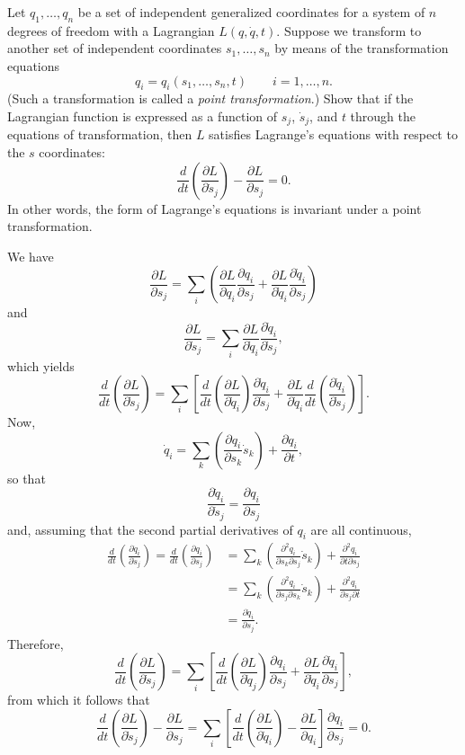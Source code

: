 \begin{questions}
\question Let $q_1, \ldots, q_n$ be a set of independent generalized coordinates for a system of $n$ degrees of freedom with a Lagrangian $L ( q, \dot{q}, t )$. Suppose we transform to another set of independent coordinates $s_1, \ldots, s_n$ by means of the transformation equations
\[
q_i = q_i ( s_1, \ldots, s_n, t ) \qquad i = 1, \ldots, n.
\]
(Such a transformation is called a \emph{point transformation}.) Show that if the Lagrangian function is expressed as a function of $s_j$, $\dot{s}_j$, and $t$ through the equations of transformation, then $L$ satisfies Lagrange's equations with respect to the $s$ coordinates:
\[
\frac{d}{dt} \left( \frac{\partial L}{\partial \dot{s}_j} \right) - \frac{\partial L}{\partial s_j} = 0.
\]
In other words, the form of Lagrange's equations is invariant under a point transformation.
\begin{solution}
We have
\[
\frac{\partial L}{\partial s_j} = \sum_i \left( \frac{\partial L}{\partial q_i} \frac{\partial q_i}{\partial s_j} + \frac{\partial L}{\partial \dot{q}_i} \frac{\partial \dot{q}_i}{\partial s_j} \right)
\]
and
\[
\frac{\partial L}{\partial \dot{s}_j} = \sum_i \frac{\partial L}{\partial \dot{q}_i} \frac{\partial \dot{q}_i}{\partial \dot{s}_j},
\]
which yields
\[
\frac{d}{dt} \left( \frac {\partial L}{\partial \dot{s}_j} \right) = \sum_i \left[ \frac{d}{dt} \left( \frac{\partial L}{\partial \dot{q}_i} \right) \frac{\partial \dot{q}_i}{\partial \dot{s}_j} + \frac{\partial L}{\partial \dot{q}_i} \frac{d}{dt} \left( \frac{\partial \dot{q}_i}{\partial \dot{s}_j} \right) \right].
\]
Now,
\[
\dot{q}_i = \sum_k \left( \frac{\partial q_i}{\partial s_k} \dot{s}_k \right) + \frac{\partial q_i}{\partial t},
\]
so that
\[
\frac{\partial \dot{q}_i}{\partial \dot{s}_j} = \frac{\partial q_i}{\partial s_j}
\]
and, assuming that the second partial derivatives of $q_i$ are all continuous,
\begin{align*}
\frac{d}{dt} \left( \frac{\partial \dot{q}_i}{\partial \dot{s}_j} \right) = \frac{d}{dt} \left( \frac{\partial q_i}{\partial s_j} \right) &= \sum_k \left( \frac{\partial^2 q_i}{\partial s_k \partial s_j} \dot{s}_k \right) + \frac{\partial^2 q_i}{\partial t \partial s_j} \\
&= \sum_k \left( \frac{\partial^2 q_i}{\partial s_j \partial s_k} \dot{s}_k \right) + \frac{\partial^2 q_i}{\partial s_j \partial t} \\
&= \frac{\partial \dot{q}_i}{\partial s_j}.
\end{align*}
Therefore,
\[
\frac{d}{dt} \left( \frac{\partial L}{\partial \dot{s}_j} \right) = \sum_i \left[ \frac{d}{dt} \left( \frac{\partial L}{\partial \dot{q}_j} \right) \frac{\partial q_i}{\partial s_j} + \frac{\partial L}{\partial \dot{q}_i} \frac{\partial \dot{q}_i}{\partial s_j} \right],
\]
from which it follows that
\[
\frac{d}{dt} \left( \frac{\partial L}{\partial \dot{s}_j} \right) - \frac{\partial L}{\partial s_j} = \sum_i \left[ \frac{d}{dt} \left( \frac{\partial L}{\partial \dot{q}_i} \right) - \frac{\partial L}{\partial q_i} \right] \frac{\partial q_i}{\partial s_j} = 0.
\]
\end{solution}


\end{questions}
